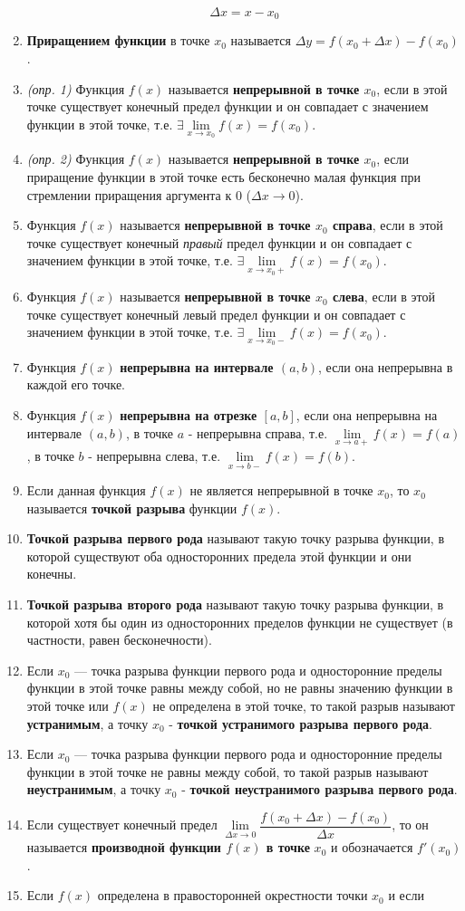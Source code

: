 \begin{enumerate}
$$\Delta x = x - x_0
    $$
\item \textbf{Приращением функции} в точке $x_0$ называется $\Delta y = f(x_0 + \Delta x) - f(x_0)$.
\item \textit{(опр. 1)} Функция $f(x)$ называется \textbf{непрерывной в точке $x_0$}, если в этой точке существует конечный предел функции и он совпадает с значением функции в этой точке, т.е. $\exists \lim\limits_{x \to x_0}f(x) = f(x_0)$.
\item \textit{(опр. 2)} Функция $f(x)$ называется \textbf{непрерывной в точке $x_0$}, если приращение функции в этой точке есть бесконечно малая функция при стремлении приращения аргумента к 0 ($\Delta x \rightarrow 0$).
\item Функция $f(x)$ называется \textbf{непрерывной в точке $x_0$ справа}, если в этой точке существует конечный \textit{правый} предел функции и он совпадает с значением функции в этой точке, т.е. $\exists \lim\limits_{x \to x_0+}f(x) = f(x_0)$.
\item Функция $f(x)$ называется \textbf{непрерывной в точке $x_0$ слева}, если в этой точке существует конечный левый предел функции и он совпадает с значением функции в этой точке, т.е. $\exists \lim\limits_{x \to x_0-}f(x) = f(x_0)$.
\item Функция $f(x)$ \textbf{непрерывна на интервале $(a, b)$}, если она непрерывна в каждой его точке.
\item Функция $f(x)$ \textbf{непрерывна на отрезке $[a, b]$}, если она непрерывна на интервале $(a, b)$, в точке $a$ - непрерывна справа, т.е. $\lim\limits_{x \to a+}f(x) = f(a)$, в точке $b$ - непрерывна слева, т.е. $\lim\limits_{x \to b-}f(x) = f(b)$.
\item Если данная функция $f(x)$ не является непрерывной в точке $x_0$, то $x_0$ называется \textbf{точкой разрыва} функции $f(x)$.
\item \textbf{Точкой разрыва первого рода} называют такую точку разрыва функции, в которой существуют оба односторонних предела этой функции и они конечны.
\item \textbf{Точкой разрыва второго рода} называют такую точку разрыва функции, в которой хотя бы один из односторонних пределов функции не существует (в частности, равен бесконечности).
\item Если $x_0$ — точка разрыва функции первого рода и односторонние пределы функции в этой точке равны между собой, но не равны значению функции в этой точке или $f(x)$ не определена в этой точке, то такой разрыв называют \textbf{устранимым}, а точку $x_0$ - \textbf{точкой устранимого разрыва первого рода}.
\item Если $x_0$ — точка разрыва функции первого рода и односторонние пределы функции в этой точке не равны между собой, то такой разрыв называют \textbf{неустранимым}, а точку $x_0$ - \textbf{точкой неустранимого разрыва первого рода}.
\item Если существует конечный предел $\lim\limits_{\Delta x \to 0} {\dfrac{f(x_0 + \Delta x) - f(x_0)}{\Delta x}}$, то он называется \textbf{производной функции $f(x)$ в точке} $x_0$ и обозначается $f'(x_0)$.
\item Если $f(x)$ определена в правосторонней окрестности точки $x_0$ и если


\end{enumerate}
